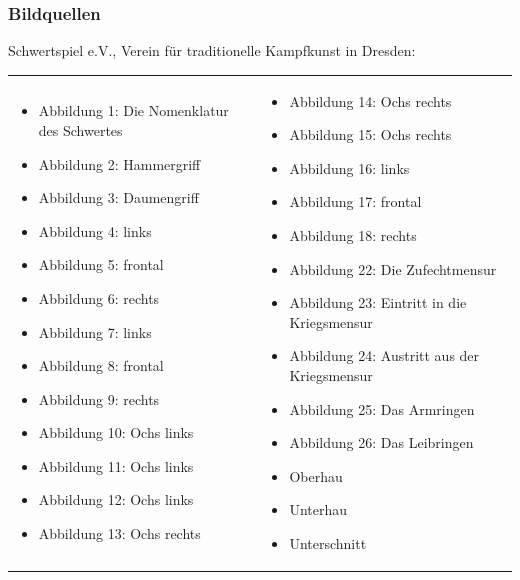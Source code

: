 \newpage

\subsubsection*{Bildquellen}

Schwertspiel e.V., Verein für traditionelle Kampfkunst in Dresden:

\begin{longtable}{p{6.25cm}p{6.25cm}}
\begin{itemize}
    \item Abbildung 1: Die Nomenklatur des Schwertes
    \item Abbildung 2: Hammergriff
    \item Abbildung 3: Daumengriff
    \item Abbildung 4: links
    \item Abbildung 5: frontal
    \item Abbildung 6: rechts
    \item Abbildung 7: links
    \item Abbildung 8: frontal
    \item Abbildung 9: rechts
    \item Abbildung 10: Ochs links
    \item Abbildung 11: Ochs links
    \item Abbildung 12: Ochs links
    \item Abbildung 13: Ochs rechts
\end{itemize}

&

\begin{itemize}
    \item Abbildung 14: Ochs rechts
    \item Abbildung 15: Ochs rechts
    \item Abbildung 16: links
    \item Abbildung 17: frontal
    \item Abbildung 18: rechts
    \item Abbildung 22: Die Zufechtmensur
    \item Abbildung 23: Eintritt in die Kriegsmensur
    \item Abbildung 24: Austritt aus der Kriegsmensur
    \item Abbildung 25: Das Armringen
    \item Abbildung 26: Das Leibringen
    \item Oberhau
    \item Unterhau
    \item Unterschnitt
\end{itemize}
\end{longtable}
\hspace{3cm}

